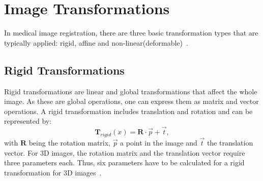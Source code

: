 \documentclass[english,version-2022-01]{uzl-thesis} %
\begin{document}
\section{Image Transformations} \label{Sec:ImageTransformations}
In medical image registration, there are three basic transformation types that are typically applied: rigid, affine and non-linear(deformable)~\cite{Strittmatter2023}.

\subsection{Rigid Transformations}
Rigid transformations are linear and global transformations that affect the whole image. As these are global operations, one can express them as matrix and vector operations. A rigid transformation includes translation and rotation and can be represented by:
\begin{equation}
	\mathbf{T}_{rigid} (x) = \mathbf{R} \cdot \overrightarrow{p} + \overrightarrow{t},
\end{equation}
with $\mathbf{R}$ being the rotation matrix, $\overrightarrow{p}$ a point in the image and $\overrightarrow{t}$ the translation vector.  For 3D images, the rotation matrix and the translation vector require three parameters each. Thus, six parameters have to be calculated for a rigid transformation for 3D images~\cite{Strittmatter2023}.
\end{document}

